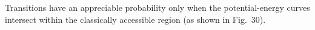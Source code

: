 Transitions have an appreciable probability only when the potential-energy curves intersect within the classically accessible region (as shown in Fig.~30).
